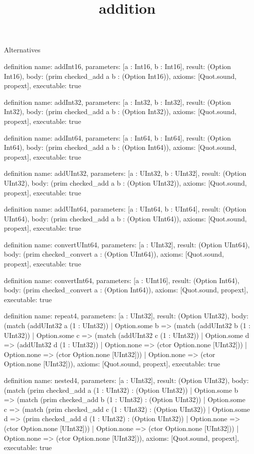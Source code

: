 \begin{lexlean}{Alternatives}
\title{addition}
\begin{semanticmodule}
definition{
  name: addInt16,
  parameters: [a : Int16, b : Int16],
  result: (Option Int16),
  body: (prim checked_add a b : (Option Int16)),
  axioms: [Quot.sound, propext],
  executable: true
}

definition{
  name: addInt32,
  parameters: [a : Int32, b : Int32],
  result: (Option Int32),
  body: (prim checked_add a b : (Option Int32)),
  axioms: [Quot.sound, propext],
  executable: true
}

definition{
  name: addInt64,
  parameters: [a : Int64, b : Int64],
  result: (Option Int64),
  body: (prim checked_add a b : (Option Int64)),
  axioms: [Quot.sound, propext],
  executable: true
}

definition{
  name: addUInt32,
  parameters: [a : UInt32, b : UInt32],
  result: (Option UInt32),
  body: (prim checked_add a b : (Option UInt32)),
  axioms: [Quot.sound, propext],
  executable: true
}

definition{
  name: addUInt64,
  parameters: [a : UInt64, b : UInt64],
  result: (Option UInt64),
  body: (prim checked_add a b : (Option UInt64)),
  axioms: [Quot.sound, propext],
  executable: true
}

definition{
  name: convertUInt64,
  parameters: [a : UInt32],
  result: (Option UInt64),
  body: (prim checked_convert a : (Option UInt64)),
  axioms: [Quot.sound, propext],
  executable: true
}

definition{
  name: convertInt64,
  parameters: [a : UInt16],
  result: (Option Int64),
  body: (prim checked_convert a : (Option Int64)),
  axioms: [Quot.sound, propext],
  executable: true
}

definition{
  name: repeat4,
  parameters: [a : UInt32],
  result: (Option UInt32),
  body: (match (addUInt32 a (1 : UInt32))
    | Option.some b => (match (addUInt32 b (1 : UInt32))
      | Option.some c => (match (addUInt32 c (1 : UInt32))
        | Option.some d => (addUInt32 d (1 : UInt32))
        | Option.none => (ctor Option.none [UInt32]))
      | Option.none => (ctor Option.none [UInt32]))
    | Option.none => (ctor Option.none [UInt32])),
  axioms: [Quot.sound, propext],
  executable: true
}

definition{
  name: nested4,
  parameters: [a : UInt32],
  result: (Option UInt32),
  body: (match (prim checked_add a (1 : UInt32) : (Option UInt32))
    | Option.some b => (match (prim checked_add b (1 : UInt32) : (Option UInt32))
      | Option.some c => (match (prim checked_add c (1 : UInt32) : (Option UInt32))
        | Option.some d => (prim checked_add d (1 : UInt32) : (Option UInt32))
        | Option.none => (ctor Option.none [UInt32]))
      | Option.none => (ctor Option.none [UInt32]))
    | Option.none => (ctor Option.none [UInt32])),
  axioms: [Quot.sound, propext],
  executable: true
}


\end{semanticmodule}
\end{lexlean}
